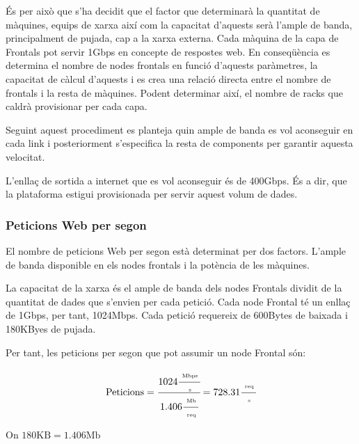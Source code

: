 És per això que s'ha decidit que el factor que determinarà la quantitat de màquines, equips de xarxa així com la capacitat d'aquests serà l'ample de banda, principalment de pujada, cap a la xarxa externa. Cada màquina de la capa de Frontals pot servir 1Gbps en concepte de respostes web. En conseqüència es determina el nombre de nodes frontals en funció d'aquests paràmetres, la capacitat de càlcul d'aquests i es crea una relació directa entre el nombre de frontals i la resta de màquines. Podent determinar així, el nombre de racks que caldrà provisionar per cada capa.

Seguint aquest procediment es planteja quin ample de banda es vol aconseguir en cada link i posteriorment s'especifica la resta de components per garantir aquesta velocitat. 

L'enllaç de sortida a internet que es vol aconseguir és de 400Gbps. És a dir, que la plataforma estigui provisionada per servir aquest volum de dades.


\subsubsection{Peticions Web per segon}

El nombre de peticions Web per segon està determinat per dos factors. L'ample de banda disponible en els nodes frontals i la potència de les màquines. 

La capacitat de la xarxa és el ample de banda dels nodes Frontals dividit de la quantitat de dades que s'envien per cada petició. Cada node Frontal té un enllaç de 1Gbps, per tant, 1024Mbps. Cada petició requereix de 600Bytes de baixada i 180KByes de pujada. 

Per tant, les peticions per segon que pot assumir un node Frontal són:

\begin{equation}
   \text{Peticions} = \cfrac{1024
                            \cfrac{\text{   \tiny{Mbps}  }}
                                  {\text{   \tiny{s}     }}
                        }
                        {1.406
                            \cfrac{\text{   \tiny{Mb}    }} 
                                  {\text{   \tiny{req}   }} 
                        }
                        = 728.31
                            \cfrac{\text{   \tiny{req}   }}
                                  {\text{   \tiny{s}     }}
\end{equation}


On $ 180\text{KB} = 1.406\text{Mb} $


